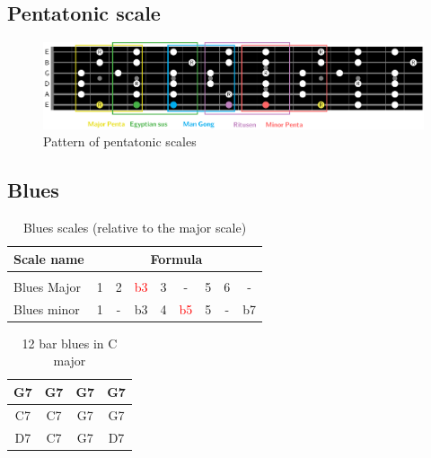 \documentclass{article}
\begin{document}
\newpage
\subsection{Pentatonic scale}
\begin{figure}[h!]
	\centering
	\hspace*{-2cm}
	\includegraphics[scale=0.55, trim= {0cm 0cm 0cm 0cm}, clip]{gamme_penta_manche/main.pdf}
	\caption{Pattern of pentatonic scales}
	\label{fig:gammme_penta_manche}
\end{figure}

\newpage
\subsection{Blues}


\begin{table}[!h]
	\caption{Blues scales (relative to the major scale)}
	\centering
	\begin{tabular}{l|cccccccc}
		Scale name  & \multicolumn{8}{c}{Formula} \\
		\hline \hline \vspace{-0.4cm} \\
		Blues Major   & 1 & 2  & \textcolor{red}{b3} & 3  &   -   & 5  & 6  &  -  \\
		Blues minor   & 1 &  - & b3 & 4  & \textcolor{red}{b5} &  5  & - &  b7 \\
	\end{tabular}
	\label{tab: }
\end{table}

\begin{table}[!h]
	\caption{12 bar blues in C major}
	\centering
	\begin{tabular}{| c | c | c | c |}
		\hline
		\phantom{x}G7\phantom{x} & \phantom{x}G7\phantom{x} & \phantom{x}G7\phantom{x} & \phantom{x}G7\phantom{x}  \\
		\hline
		\phantom{x}C7\phantom{x} & \phantom{x}C7\phantom{x} & \phantom{x}G7\phantom{x} & \phantom{x}G7\phantom{x}  \\
		\hline
		\phantom{x}D7\phantom{x} & \phantom{x}C7\phantom{x} & \phantom{x}G7\phantom{x} & \phantom{x}D7\phantom{x}  \\
		\hline
	\end{tabular}
	\label{tab: }
\end{table}
\end{document}
